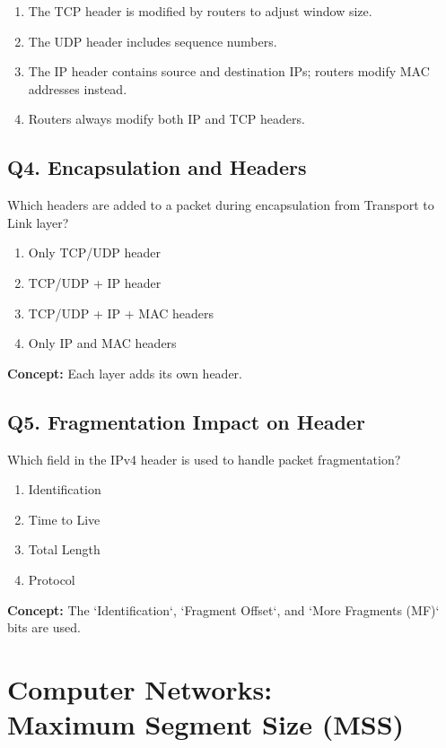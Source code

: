 \begin{enumerate}[label=(\alph*)]
    \item The TCP header is modified by routers to adjust window size.
    \item The UDP header includes sequence numbers.
    \item The IP header contains source and destination IPs; routers modify MAC addresses instead.
    \item Routers always modify both IP and TCP headers.
\end{enumerate}



\subsection*{Q4. Encapsulation and Headers}
Which headers are added to a packet during encapsulation from Transport to Link layer?

\begin{enumerate}[label=(\alph*)]
    \item Only TCP/UDP header
    \item TCP/UDP + IP header
    \item TCP/UDP + IP + MAC headers
    \item Only IP and MAC headers
\end{enumerate}

\textbf{Concept:} Each layer adds its own header.


\subsection*{Q5. Fragmentation Impact on Header}
Which field in the IPv4 header is used to handle packet fragmentation?

\begin{enumerate}[label=(\alph*)]
    \item Identification
    \item Time to Live
    \item Total Length
    \item Protocol
\end{enumerate}

\textbf{Concept:} The `Identification`, `Fragment Offset`, and `More Fragments (MF)` bits are used.


\section[Computer Networks: Maximum Segment Size (MSS)]
{Computer Networks:\\ Maximum Segment Size (MSS)}

